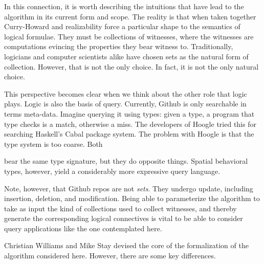 In this connection, it is worth describing the intuitions that have
lead to the algorithm in its current form and scope. The reality is
that when taken together Curry-Howard and realizability force a
particular shape to the semantics of logical formulae. They must be
collections of witnesses, where the witnesses are computations
evincing the properties they bear witness to. Traditionally, logicians
and computer scientists alike have chosen sets as the natural form of
collection. However, that is not the only choice. In fact, it is not
the only natural choice.

This perspective becomes clear when we think about the other role that
logic plays. Logic is also the basis of query. Currently, Github is
only searchable in terms meta-data. Imagine querying it using
types: given a type, a program that type checks is a match, otherwise
a miss. The developers of Hoogle tried this for searching Haskell's
Cabal package system. The problem with Hoogle is that the type system
is too coarse. Both

bear the same type signature, but they do opposite things. Spatial
behavioral types, however, yield a considerably more expressive query
language.

Note, however, that Github repos are not \emph{sets}. They undergo
update, including insertion, deletion, and modification. Being able to
parameterize the algorithm to take as input the kind of collections
used to collect witnesses, and thereby generate the corresponding
logical connectives is vital to be able to consider query applications
like the one contemplated here.

Christian Williams and Mike Stay devised the core of the formalization
of the algorithm considered here. However, there are some key
differences.


